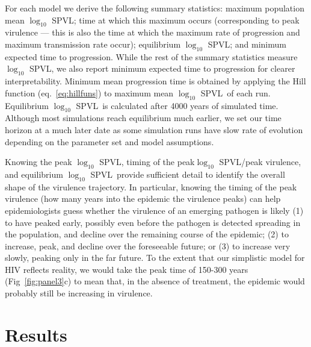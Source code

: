 \documentclass[10pt,letterpaper]{article}
\renewcommand{\figurename}{Fig}
\newcommand{\Lspvl}{$\log_{10}$ SPVL}
\begin{document}
For each model we derive the following summary statistics:
maximum population mean \Lspvl;
time at which this maximum occurs
(corresponding to peak virulence --- this is also the time at which the
maximum rate of progression and maximum transmission rate
occur); equilibrium \Lspvl; 
and minimum expected time to progression. 
While the rest of the summary statistics measure \Lspvl, we also report minimum expected time to progression for clearer interpretability.
Minimum mean progression time is obtained by applying the Hill function (eq.~\ref{eq:hillfuns}) to maximum mean \Lspvl\ of each run.
Equilibrium \Lspvl\ is calculated after 4000 years of simulated
time. 
Although most simulations reach equilibrium much earlier, we set our time horizon at a much later date as some simulation runs have slow rate of evolution depending on the parameter set and model assumptions.

Knowing the peak \Lspvl, timing of the peak\Lspvl/peak virulence, and equilibrium \Lspvl\ provide sufficient detail to identify the overall shape of the virulence trajectory.
In particular, knowing the timing of the peak virulence (how many years
into the epidemic the virulence peaks) can help epidemiologists
guess whether the virulence of an emerging pathogen is likely (1)
to have peaked early, possibly even before the pathogen is detected
spreading in the population, and decline over the remaining course
of the epidemic; (2) to increase, peak, and decline over the
foreseeable future; or (3) to increase very slowly, peaking only
in the far future. To the extent that our simplistic model for HIV
reflects reality, we would take the peak time of 150-300 years 
(\figurename~\ref{fig:panel3}c) to mean that, in the absence of
treatment, the epidemic would probably still be increasing in virulence.

\section*{Results}
\end{document}
